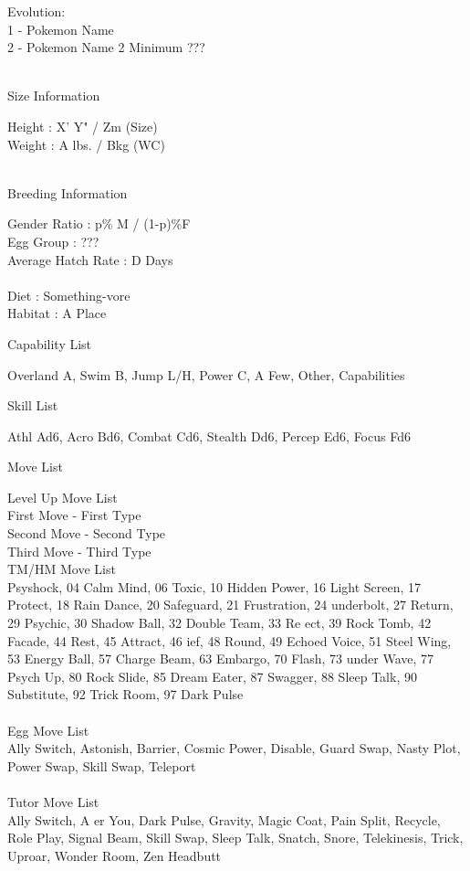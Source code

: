 \documentclass{article}
\begin{document}
\begin{multicols}{2}
\noindent Evolution:\\
1 - Pokemon Name\\
2 - Pokemon Name 2 Minimum ???
\\\\
\begin{center}Size Information\end{center}
Height : X' Y" / Zm (Size)\\
Weight : A lbs. / Bkg (WC)
\\\\
\begin{center}Breeding Information\end{center}
Gender Ratio : p\% M / (1-p)\%F\\
Egg Group : ???\\
Average Hatch Rate : D Days
\\\\
\noindent Diet : Something-vore\\
Habitat : A Place
\vfill\null
\columnbreak
\begin{center}Capability List\end{center}
Overland A, Swim B, Jump L/H, Power C, A Few, Other, Capabilities

\begin{center}Skill List\end{center}
Athl Ad6, Acro Bd6, Combat Cd6, Stealth Dd6, Percep Ed6, Focus Fd6

\begin{center}Move List\end{center}
Level Up Move List\\
\indent{} First Move - First Type\\
\indent{} Second Move - Second Type\\
\indent{} Third Move - Third Type\\

\noindent TM/HM Move List\\
\indent{} Psyshock, 04 Calm Mind, 06 Toxic, 10
Hidden Power, 16 Light Screen, 17 Protect, 18 Rain Dance, 20 Safeguard, 21 Frustration, 24  underbolt, 27 Return, 29 Psychic, 30 Shadow Ball, 32 Double Team, 33 Re ect, 39 Rock Tomb, 42 Facade, 44 Rest, 45 Attract, 46  ief, 48 Round, 49 Echoed Voice,
51 Steel Wing, 53 Energy Ball, 57 Charge Beam, 63 Embargo, 70 Flash, 73  under Wave, 77 Psych Up, 80 Rock Slide, 85 Dream Eater, 87 Swagger, 88 Sleep Talk, 90 Substitute, 92 Trick Room, 97 Dark Pulse
\\\\
Egg Move List\\
\indent\indent Ally Switch, Astonish, Barrier, Cosmic Power,
Disable, Guard Swap, Nasty Plot, Power Swap, Skill Swap, Teleport
\\\\
Tutor Move List\\
\indent\indent Ally Switch, A er You, Dark Pulse, Gravity, Magic Coat, Pain Split, Recycle, Role Play, Signal Beam, Skill Swap, Sleep Talk, Snatch, Snore, Telekinesis, Trick, Uproar, Wonder Room, Zen Headbutt
\end{multicols}
\end{document}
